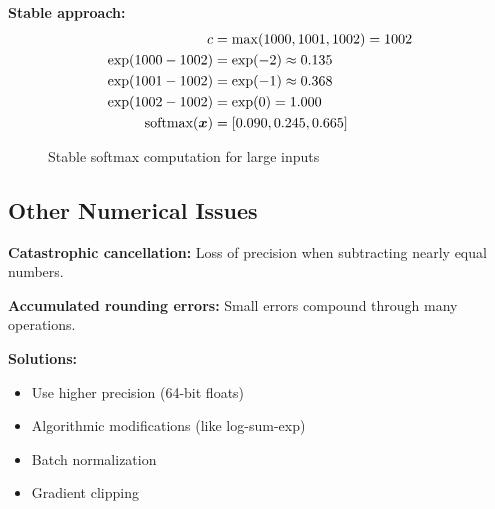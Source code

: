 \textbf{Stable approach:}
\begin{align}
c &= \max(1000, 1001, 1002) = 1002 \\
\exp(1000-1002) &= \exp(-2) \approx 0.135 \\
\exp(1001-1002) &= \exp(-1) \approx 0.368 \\
\exp(1002-1002) &= \exp(0) = 1.000 \\
\text{softmax}(\boldsymbol{x}) &= [0.090, 0.245, 0.665]
\end{align}

\begin{figure}[h]
\centering
{}
\caption{Stable softmax computation for large inputs}
\label{fig:stable-softmax}
\end{figure}

\subsection{Other Numerical Issues}

\textbf{Catastrophic cancellation:} Loss of precision when subtracting nearly equal numbers.

\textbf{Accumulated rounding errors:} Small errors compound through many operations.

\textbf{Solutions:}
\begin{itemize}
    \item Use higher precision (64-bit floats)
    \item Algorithmic modifications (like log-sum-exp)
    \item Batch normalization
    \item Gradient clipping
\end{itemize}
